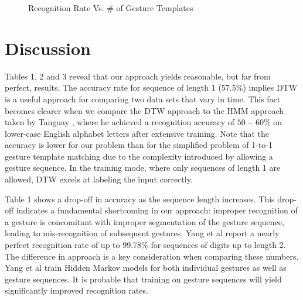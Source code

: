 \documentclass[twoside]{article}
\begin{document}
\begin{multicols}{2}
\begin{figure}[H]
	\caption{Recognition Rate Vs. \# of Gesture Templates}
	\label{fig3}
\end{figure}
\section{Discussion}


Tables 1, 2 and 3 reveal that our approach yields reasonable, but far from
perfect, results. The accuracy rate for sequence of length 1 (57.5\%) implies
DTW is a useful approach for comparing two data sets that vary in time.
This fact becomes clearer when we compare the DTW approach to the HMM approach
taken by Tanguay \cite{tanguay_jr_hidden_1995}, where he achieved a recognition
accuracy of $50-60\%$ on lower-case English alphabet letters after extensive
training. Note that the accuracy is lower for our problem than for the
simplified problem of 1-to-1 gesture template matching due to the complexity
introduced by allowing a gesture sequence. In the training mode, where only sequences of
length 1 are allowed, DTW excels at labeling the input correctly.

Table 1 shows a drop-off in accuracy as the sequence length increases. This
drop-off indicates a fundamental shortcoming in our approach: improper
recognition of a gesture is concomitant with improper segmentation of the
gesture sequence, leading to mis-recognition of subsequent gestures. Yang et al
\cite{yang_gesture_1994} report a nearly perfect recognition rate of up to
99.78\% for sequences of digits up to length 2. The difference in approach is a
key consideration when comparing these numbers. Yang et al train Hidden Markov
models for both individual gestures as well as gesture sequences. It is probable
that training on gesture sequences will yield significantly improved
recognition rates.


\end{multicols}
\end{document}
